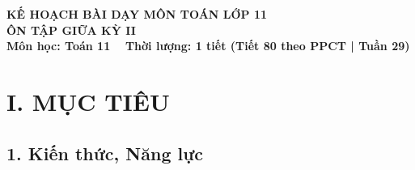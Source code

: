 \documentclass[12pt, a4paper]{article}
\begin{document}
\begin{center}
    {\fontsize{14pt}{17pt}\selectfont \textbf{KẾ HOẠCH BÀI DẠY MÔN TOÁN LỚP 11}}\\[6pt]
    {\fontsize{16pt}{19pt}\selectfont \textbf{ÔN TẬP GIỮA KỲ II}}\\[4pt]
    {\fontsize{12pt}{15pt}\selectfont \textbf{Môn học: Toán 11} \ \textbar \ \textbf{Thời lượng: 1 tiết (Tiết 80 theo PPCT | Tuần 29)}}
\end{center}

\vspace{5pt}

\section*{I. MỤC TIÊU}

\subsection*{1. Kiến thức, Năng lực}
\end{document}
